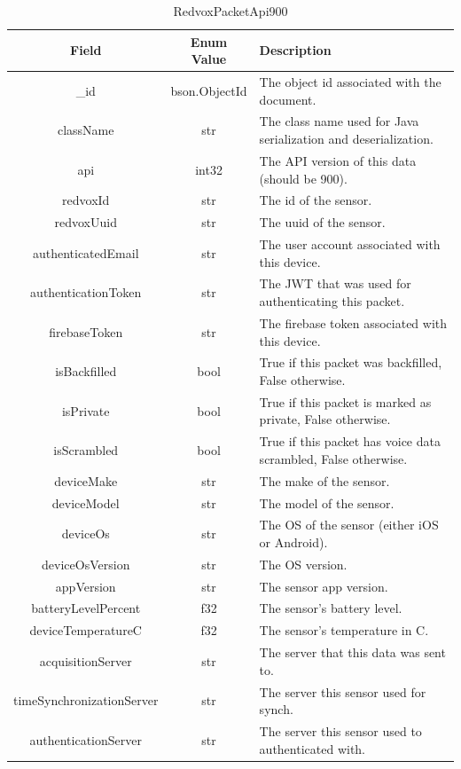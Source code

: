 \begin{table}[H]
	\centering
	\caption{RedvoxPacketApi900}
	\begin{tabular}{|c|c| p{7.5cm} |}
		\hline
		Field & Enum Value & Description  \\
		\hline
		\_id & bson.ObjectId & The object id associated with the document. \\
		\hline
		className & str & The class name used for Java serialization and deserialization. \\
		\hline
		api & int32 & The API version of this data (should be 900). \\
		\hline
		redvoxId & str & The id of the sensor. \\
		\hline
		redvoxUuid & str & The uuid of the sensor. \\
		\hline
		authenticatedEmail & str & The user account associated with this device. \\
		\hline
		authenticationToken & str & The JWT that was used for authenticating this packet. \\
		\hline
		firebaseToken & str & The firebase token associated with this device. \\
		\hline
		isBackfilled & bool & True if this packet was backfilled, False otherwise. \\
		\hline
		isPrivate & bool & True if this packet is marked as private, False otherwise. \\
		\hline
		isScrambled & bool & True if this packet has voice data scrambled, False otherwise. \\
		\hline
		deviceMake & str & The make of the sensor. \\
		\hline
		deviceModel & str & The model of the sensor. \\
		\hline
		deviceOs & str & The OS of the sensor (either iOS or Android). \\
		\hline
		deviceOsVersion & str & The OS version. \\
		\hline
		appVersion & str & The sensor app version. \\
		\hline
		batteryLevelPercent & f32 & The sensor's battery level. \\
		\hline
		deviceTemperatureC & f32 & The sensor's temperature in C. \\
		\hline
		acquisitionServer & str & The server that this data was sent to. \\
		\hline
		timeSynchronizationServer & str & The server this sensor used for synch. \\
		\hline
		authenticationServer & str & The server this sensor used to authenticated with. \\

\end{tabular}
\end{table}
